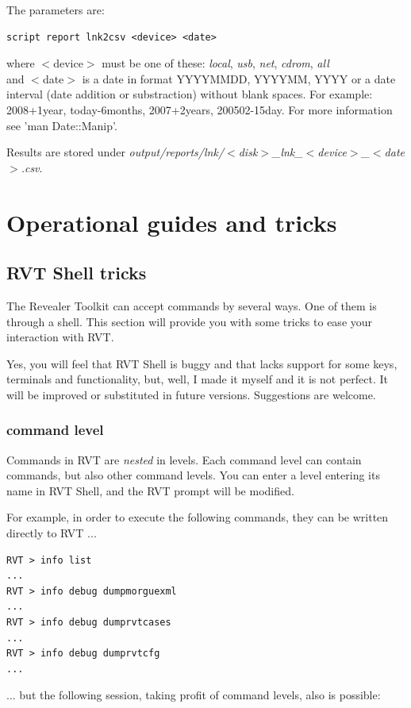 \documentclass[a4paper,11pt,oneside]{report}
\begin{document}
The parameters are:
\begin{verbatim}
script report lnk2csv <device> <date>
\end{verbatim}
where $<$device$>$ must be one of these: \emph{local}, \emph{usb}, \emph{net}, \emph{cdrom}, \emph{all}\\
and $<$date$>$ is a date in format YYYYMMDD, YYYYMM, YYYY or a date interval (date addition or substraction) without blank spaces. 
For example: 2008+1year, today-6months, 2007+2years, 200502-15day. For more information  see 'man Date::Manip'.

Results are stored under \emph{output/reports/lnk/$<$disk$>$\_lnk\_$<$device$>$\_$<$date$>$.csv}.
\chapter{Operational guides and tricks}



\section{RVT Shell tricks}

The Revealer Toolkit can accept commands by several ways. One of them is through a shell. This section will provide you with some tricks to ease your interaction with RVT.

Yes, you will feel that RVT Shell is buggy and that lacks support for some keys, terminals and functionality, but, well, I made it myself and it is not perfect. It will be improved or substituted in future versions. Suggestions are welcome.


\subsection{command level}

Commands in RVT are \emph{nested} in levels. Each command level can contain commands, but also other command levels. You can enter a level entering its name in RVT Shell, and the RVT prompt will be modified.

For example, in order to execute the following commands, they can be written directly to RVT ...

\begin{verbatim}
RVT > info list
...
RVT > info debug dumpmorguexml
...
RVT > info debug dumprvtcases
...
RVT > info debug dumprvtcfg
...
\end{verbatim}


... but the following session, taking profit of command levels, also is possible:
\end{document}
